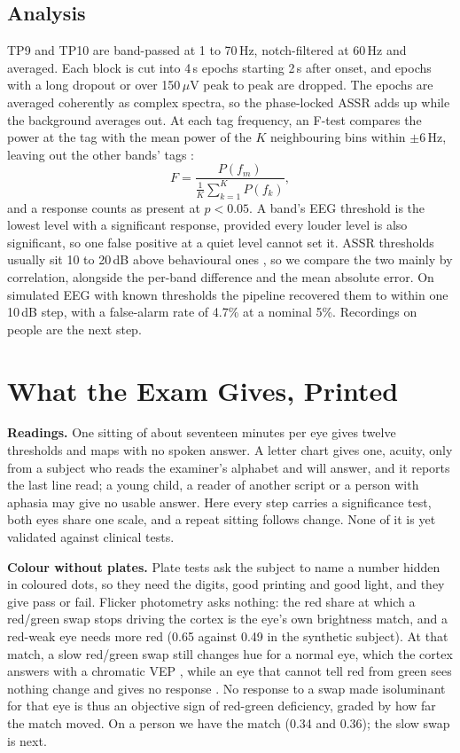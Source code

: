 \documentclass[conference]{IEEEtran}
\begin{document}
\subsection{Analysis}
TP9 and TP10 are band-passed at 1 to 70\,Hz, notch-filtered at 60\,Hz and averaged. Each block is cut into 4\,s epochs starting 2\,s after onset, and epochs with a long dropout or over 150\,$\mu$V peak to peak are dropped. The epochs are averaged coherently as complex spectra, so the phase-locked ASSR adds up while the background averages out. At each tag frequency, an F-test compares the power at the tag with the mean power of the $K$ neighbouring bins within $\pm$6\,Hz, leaving out the other bands' tags \cite{dobie1996}:
\begin{equation}
  F = \frac{P(f_m)}{\frac{1}{K}\sum_{k=1}^{K} P(f_k)},
\end{equation}
and a response counts as present at $p < 0.05$. A band's EEG threshold is the lowest level with a significant response, provided every louder level is also significant, so one false positive at a quiet level cannot set it. ASSR thresholds usually sit 10 to 20\,dB above behavioural ones \cite{vanmaanen2005,tlumak2007}, so we compare the two mainly by correlation, alongside the per-band difference and the mean absolute error. On simulated EEG with known thresholds the pipeline recovered them to within one 10\,dB step, with a false-alarm rate of 4.7\% at a nominal 5\%. Recordings on people are the next step.

\section{What the Exam Gives, Printed}\label{sec:offers}
\textbf{Readings.} One sitting of about seventeen minutes per eye gives twelve thresholds and maps with no spoken answer. A letter chart gives one, acuity, only from a subject who reads the examiner's alphabet and will answer, and it reports the last line read; a young child, a reader of another script or a person with aphasia may give no usable answer. Here every step carries a significance test, both eyes share one scale, and a repeat sitting follows change. None of it is yet validated against clinical tests.

\textbf{Colour without plates.} Plate tests ask the subject to name a number hidden in coloured dots, so they need the digits, good printing and good light, and they give pass or fail. Flicker photometry asks nothing: the red share at which a red/green swap stops driving the cortex is the eye's own brightness match, and a red-weak eye needs more red (0.65 against 0.49 in the synthetic subject). At that match, a slow red/green swap still changes hue for a normal eye, which the cortex answers with a chromatic VEP \cite{rabin1994chromatic}, while an eye that cannot tell red from green sees nothing change and gives no response \cite{crognale1993deficiency}. No response to a swap made isoluminant for that eye is thus an objective sign of red-green deficiency, graded by how far the match moved. On a person we have the match (0.34 and 0.36); the slow swap is next.
\end{document}
